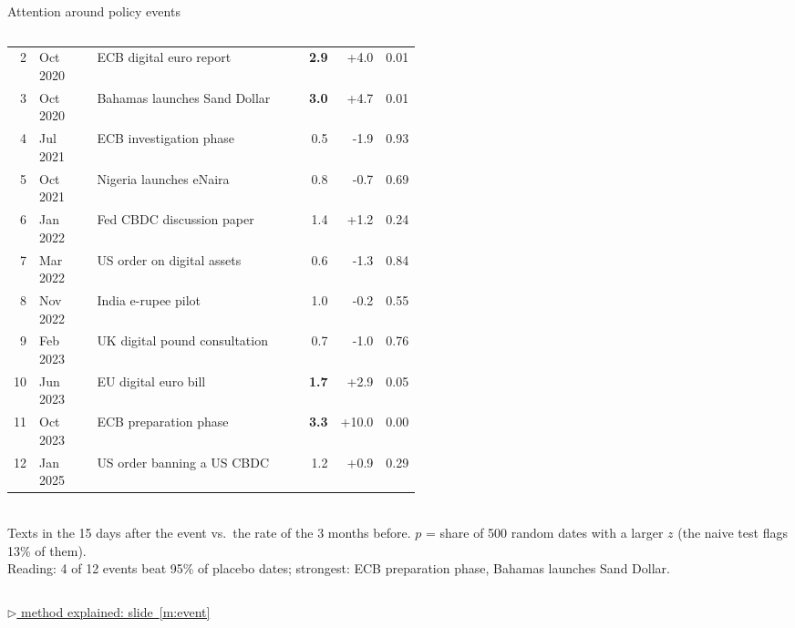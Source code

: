 \documentclass[aspectratio=169,10pt]{beamer}
\newcommand{\method}[1]{\hfill\hyperref[#1]{\tiny\textcolor{c4}{$\triangleright$ method explained: slide~\ref*{#1}}}}
\begin{document}
\begin{frame}{Attention around policy events}
\begin{columns}[c]
\begin{column}{0.5\textwidth}
\begin{tabular}{@{}rlp{0.52\linewidth}rrr@{}}
2 & Oct 2020 & ECB digital euro report & \textbf{2.9} & +4.0 & 0.01 \\
3 & Oct 2020 & Bahamas launches Sand Dollar & \textbf{3.0} & +4.7 & 0.01 \\
4 & Jul 2021 & ECB investigation phase & 0.5 & -1.9 & 0.93 \\
5 & Oct 2021 & Nigeria launches eNaira & 0.8 & -0.7 & 0.69 \\
6 & Jan 2022 & Fed CBDC discussion paper & 1.4 & +1.2 & 0.24 \\
7 & Mar 2022 & US order on digital assets & 0.6 & -1.3 & 0.84 \\
8 & Nov 2022 & India e-rupee pilot & 1.0 & -0.2 & 0.55 \\
9 & Feb 2023 & UK digital pound consultation & 0.7 & -1.0 & 0.76 \\
10 & Jun 2023 & EU digital euro bill & \textbf{1.7} & +2.9 & 0.05 \\
11 & Oct 2023 & ECB preparation phase & \textbf{3.3} & +10.0 & 0.00 \\
12 & Jan 2025 & US order banning a US CBDC & 1.2 & +0.9 & 0.29 \\
\bottomrule\end{tabular}\\[3pt]
\scriptsize Texts in the 15 days after the event vs.\ the rate of the 3 months before. $p$ = share of 500 random dates with a larger $z$ (the naive test flags 13\% of them).\\[2pt]
\alert{Reading}: 4 of 12 events beat 95\% of placebo dates; strongest: ECB preparation phase, Bahamas launches Sand Dollar.
\end{column}
\end{columns}
\method{m:event}
\end{frame}
\end{document}
